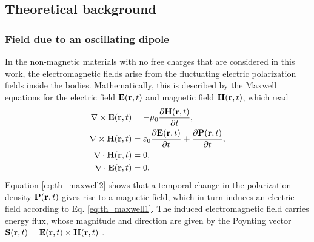 \subsection{Theoretical background}

\subsubsection{Field due to an oscillating dipole}

In the non-magnetic materials with no free charges that are considered in this work, the electromagnetic fields arise from the fluctuating electric polarization fields inside the bodies. Mathematically, this is described by the Maxwell equations for the electric field $\mathbf{E}(\mathbf{r},t)$ and magnetic field $\mathbf{H}(\mathbf{r},t)$, which read \cite{novotny}
\begin{subequations}
\begin{align}
  \nabla \times \mathbf{E}(\mathbf{r},t) &= - \mu_0 \frac{\partial \mathbf{H}(\mathbf{r},t)}{\partial t}, \label{eq:th_maxwell1} \\
  \nabla \times \mathbf{H}(\mathbf{r},t) &= \varepsilon_0 \frac{\partial \mathbf{E}(\mathbf{r},t)}{\partial t} + \frac{\partial \mathbf{P}(\mathbf{r},t)}{\partial t}, \label{eq:th_maxwell2} \\
   \nabla \cdot \mathbf{H}(\mathbf{r},t) &= 0, \\
   \nabla \cdot \mathbf{E}(\mathbf{r},t) &= 0.
\end{align}
\end{subequations}
Equation \eqref{eq:th_maxwell2} shows that a temporal change in the polarization density $\mathbf{P}(\mathbf{r},t)$ gives rise to a magnetic field, which in turn induces an electric field according to Eq. \eqref{eq:th_maxwell1}. The induced electromagnetic field carries energy flux, whose magnitude and direction are given by the Poynting vector $\mathbf{S}(\mathbf{r},t)=\mathbf{E}(\mathbf{r},t)\times \mathbf{H}(\mathbf{r},t)$ \cite{novotny}.

